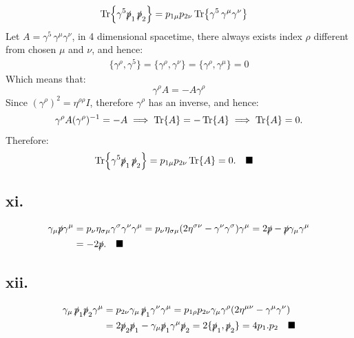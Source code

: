 \documentclass{article}
\newcommand{\slashp}{\slashed{p}}
\begin{document}
\begin{equation}
    \begin{split}
        \Tr{\gamma^5 \slashp_1\, \slashp_2} &=p_{1\mu} p_{2\nu}\Tr{\gamma^5\, \gamma^\mu \gamma^\nu}
    \end{split}
\end{equation}
Let $A=\gamma^5\, \gamma^\mu \gamma^\nu$, in 4 dimensional spacetime, there always exists index $\rho$ different from chosen $\mu$ and $\nu$, and hence:
\begin{equation}
    \begin{split}
        \{\gamma^\rho,\gamma^5 \} = \{\gamma^\rho,\gamma^\nu \} = \{\gamma^\rho, \gamma^\mu \} = 0
    \end{split}
\end{equation}
Which means that:
\begin{equation}
    \gamma^\rho A = -A\gamma^\rho
\end{equation}
Since $(\gamma^\rho)^2 = \eta^{\rho\rho}I$, therefore $\gamma^\rho$ has an inverse, and hence:
\begin{equation}
    \begin{split}
        \gamma^\rho A (\gamma^\rho)^{-1} = -A \implies \Tr{A} = -\Tr{A} \implies \Tr{A} = 0.
    \end{split}
\end{equation}
Therefore:
\begin{equation}
    \begin{split}
        \Tr{\gamma^5 \slashp_1\, \slashp_2} &=p_{1\mu} p_{2\nu}\Tr{A}=0. \quad \blacksquare
    \end{split}
\end{equation}


\subsection*{xi.}
\begin{equation}
    \begin{split}
        \gamma_\mu \slashp \gamma^\mu &= p_\nu \eta_{\sigma\mu}\gamma^\sigma\gamma^\nu \gamma^\mu=p_\nu \eta_{\sigma\mu}(2\eta^{\sigma\nu}-\gamma^\nu\gamma^\sigma)\gamma^\mu=2\slashp-\slashp \gamma_\mu\gamma^\mu \\
        & = -2\slashp. \quad \blacksquare
    \end{split}
\end{equation}

\subsection*{xii.}
\begin{equation}
\begin{split}
        \gamma_\mu\,\slashp_1\slashp_2 \gamma^\mu&= p_{2\nu}\gamma_\mu\,\slashp_1 \gamma^\nu\gamma^\mu = p_{1\rho}p_{2\nu}\gamma_\mu\gamma^\rho (2\eta^{\mu\nu}-\gamma^\mu \gamma^\nu) \\
        &= 2\slashp_2\slashp_1 - \gamma_\mu \slashp_1 \gamma^\mu \slashp_2 = 2\{\slashp_1, \slashp_2\} = 4p_1.p_2 \quad \blacksquare
\end{split}
\end{equation}
\end{document}
